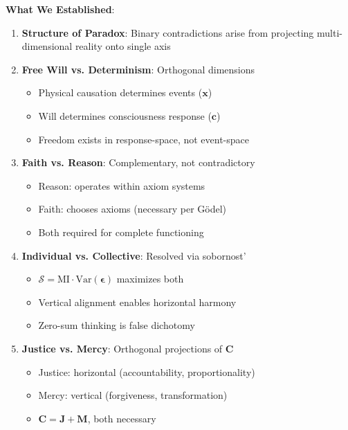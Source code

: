 \documentclass[11pt,a4paper]{article}
\theoremstyle{definition}
\theoremstyle{remark}
\newcommand{\cc}{\mathbf{c}}
\begin{document}
\begin{small}
\begin{enumerate}
\begin{mdframed}[backgroundcolor=green!10,linewidth=2pt,linecolor=green!70!black]
\textbf{What We Established}:
\begin{enumerate}[nosep]
    \item \textbf{Structure of Paradox}: Binary contradictions arise from projecting multi-dimensional reality onto single axis
    \item \textbf{Free Will vs. Determinism}: Orthogonal dimensions
        \begin{itemize}[nosep]
            \item Physical causation determines events (\(\mathbf{x}\))
            \item Will determines consciousness response (\(\cc\))
            \item Freedom exists in response-space, not event-space
        \end{itemize}
    \item \textbf{Faith vs. Reason}: Complementary, not contradictory
        \begin{itemize}[nosep]
            \item Reason: operates within axiom systems
            \item Faith: chooses axioms (necessary per Gödel)
            \item Both required for complete functioning
        \end{itemize}
    \item \textbf{Individual vs. Collective}: Resolved via sobornost'
        \begin{itemize}[nosep]
            \item \(\mathcal{S} = \text{MI} \cdot \text{Var}(\boldsymbol{\epsilon})\) maximizes both
            \item Vertical alignment enables horizontal harmony
            \item Zero-sum thinking is false dichotomy
        \end{itemize}
    \item \textbf{Justice vs. Mercy}: Orthogonal projections of \(\mathbf{C}\)
        \begin{itemize}[nosep]
            \item Justice: horizontal (accountability, proportionality)
            \item Mercy: vertical (forgiveness, transformation)
            \item \(\mathbf{C} = \mathbf{J} + \mathbf{M}\), both necessary
        \end{itemize}
\end{enumerate}


\end{mdframed}
\end{enumerate}
\end{small}
\end{document}

